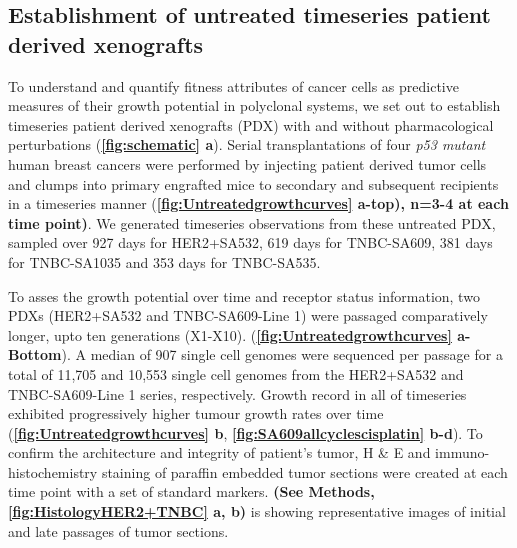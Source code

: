\subsection{Establishment of untreated timeseries patient derived xenografts}

To understand and quantify fitness attributes of cancer cells as  predictive measures of their growth potential in polyclonal systems, we set out to establish timeseries patient derived xenografts (PDX) with and without pharmacological perturbations (\textbf{\autoref{fig:schematic} a}).
Serial transplantations of four \textit{p53 mutant} human breast cancers were performed by injecting patient derived tumor cells and clumps into primary engrafted mice to secondary and subsequent recipients in a timeseries manner (\textbf{\autoref{fig:Untreatedgrowthcurves} a-top), n=3-4 at each time point)}. 
We generated timeseries observations from these untreated PDX, sampled over 927 days for HER2+SA532, 619 days for TNBC-SA609, 381 days for TNBC-SA1035 and 353 days for TNBC-SA535. 

To asses the growth potential over time and receptor status information, two PDXs (HER2+SA532 and TNBC-SA609-Line 1) were passaged comparatively longer, upto ten generations (X1-X10).
 (\textbf{\autoref{fig:Untreatedgrowthcurves} a-Bottom}).
 A median of 907 single cell genomes were sequenced per passage for a total of 11,705 and 10,553 single cell genomes from the HER2+SA532 and TNBC-SA609-Line 1 series, respectively. 
Growth record in all of timeseries exhibited progressively higher tumour growth rates over time (\textbf{\autoref{fig:Untreatedgrowthcurves} b}, \textbf{\autoref{fig:SA609allcyclescisplatin} b-d}). To confirm the architecture and integrity of patient's tumor, H \& E and immuno-histochemistry staining of paraffin embedded tumor sections were created at each time point with a set of standard markers. \textbf{(See Methods, {\autoref{fig:HistologyHER2+TNBC}} a, b)} is showing representative images of initial and late passages of tumor sections. 

